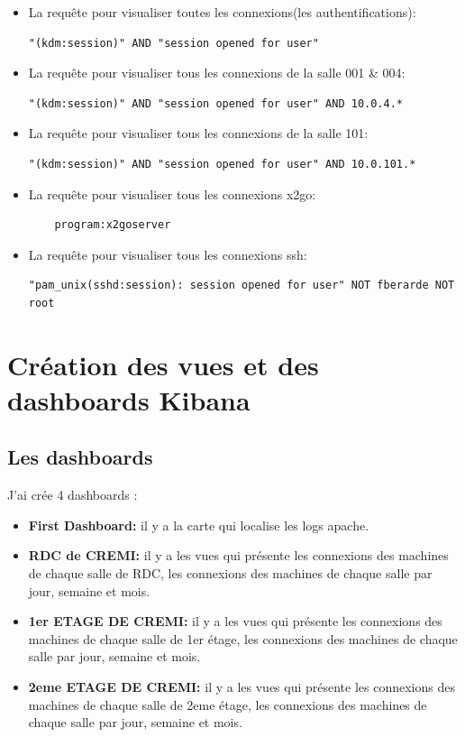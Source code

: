 \documentclass[11pt,a4paper]{article}
\begin{document}
\newpage

\begin{itemize}
 \item La requête pour visualiser toutes les connexions(les authentifications):

\begin{verbatim}
"(kdm:session)" AND "session opened for user"
\end{verbatim}
\item La requête pour visualiser tous les connexions de la salle 001 \& 004:

\begin{verbatim}
"(kdm:session)" AND "session opened for user" AND 10.0.4.*
\end{verbatim}

\item La requête pour visualiser tous les connexions de la salle 101:

\begin{verbatim}
"(kdm:session)" AND "session opened for user" AND 10.0.101.*
\end{verbatim}

\item La requête pour visualiser tous les connexions x2go:

\begin{verbatim}
 	program:x2goserver
\end{verbatim}

\item La requête pour visualiser tous les connexions ssh:

\begin{verbatim}
"pam_unix(sshd:session): session opened for user" NOT fberarde NOT root
\end{verbatim}

\end{itemize}
\section{Création des vues et des dashboards Kibana} 

\subsection{Les dashboards} 
J'ai crée 4 dashboards :
\begin{itemize}
\item\textbf{ First Dashboard: } il y a la carte qui localise les logs apache. 
\item\textbf{ RDC de CREMI:} il y a les vues qui présente les connexions des machines de chaque salle de RDC, les connexions des machines de chaque salle par jour, semaine et mois.
\item\textbf{ 1er ETAGE DE CREMI:}  il y a les vues qui présente les connexions des machines de chaque salle de 1er étage, les connexions des machines de chaque salle par jour, semaine et mois.
\item\textbf{ 2eme ETAGE DE CREMI:}  il y a les vues qui présente les connexions des machines de chaque salle de 2eme étage, les connexions des machines de chaque salle par jour, semaine et mois.
\end{itemize}
\end{document}
